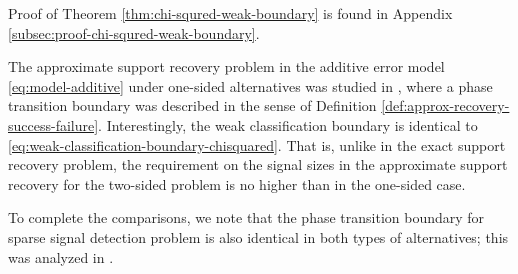 Proof of Theorem \ref{thm:chi-squred-weak-boundary} is found in Appendix \ref{subsec:proof-chi-squred-weak-boundary}. 

\begin{remark}
The approximate support recovery problem in the additive error model \eqref{eq:model-additive} under one-sided alternatives was studied in \cite{arias2017distribution}, where a phase transition boundary was described in the sense of Definition \ref{def:approx-recovery-success-failure}.
Interestingly, the weak classification boundary is identical to \eqref{eq:weak-classification-boundary-chisquared}.
That is, unlike in the exact support recovery problem, the requirement on the signal sizes in the approximate support recovery for the two-sided problem is no higher than in the one-sided case.

To complete the comparisons, we note that the phase transition boundary for sparse signal detection problem is also identical in both types of alternatives; this was analyzed in \cite{donoho2004higher}.
\end{remark}